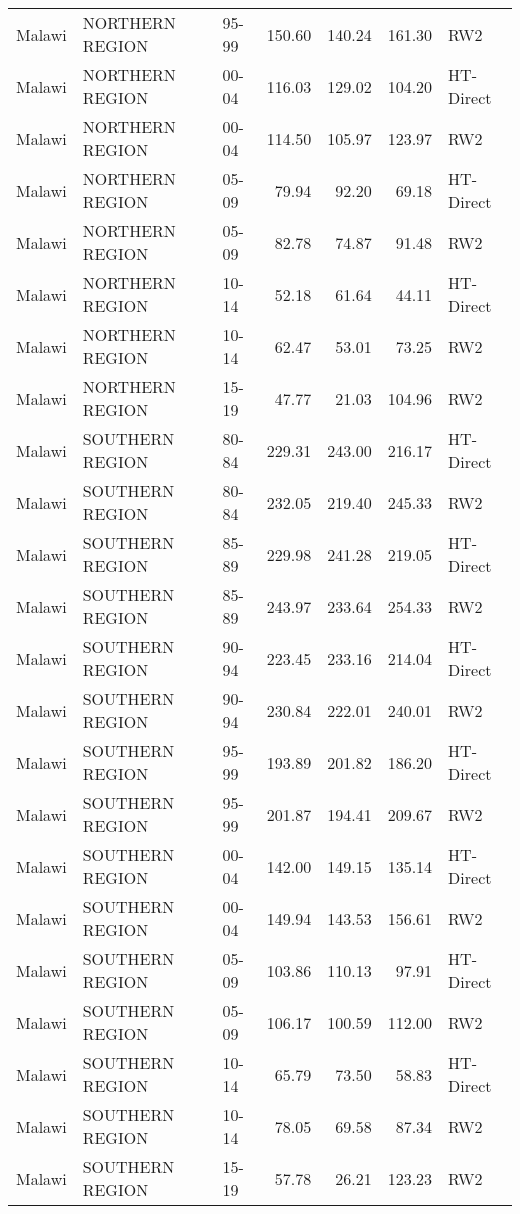 \begin{longtable}{lllrrrl}
  Malawi & NORTHERN REGION & 95-99 & 150.60 & 140.24 & 161.30 & RW2 \\ 
  Malawi & NORTHERN REGION & 00-04 & 116.03 & 129.02 & 104.20 & HT-Direct \\ 
  Malawi & NORTHERN REGION & 00-04 & 114.50 & 105.97 & 123.97 & RW2 \\ 
  Malawi & NORTHERN REGION & 05-09 & 79.94 & 92.20 & 69.18 & HT-Direct \\ 
  Malawi & NORTHERN REGION & 05-09 & 82.78 & 74.87 & 91.48 & RW2 \\ 
  Malawi & NORTHERN REGION & 10-14 & 52.18 & 61.64 & 44.11 & HT-Direct \\ 
  Malawi & NORTHERN REGION & 10-14 & 62.47 & 53.01 & 73.25 & RW2 \\ 
  Malawi & NORTHERN REGION & 15-19 & 47.77 & 21.03 & 104.96 & RW2 \\ 
  Malawi & SOUTHERN REGION & 80-84 & 229.31 & 243.00 & 216.17 & HT-Direct \\ 
  Malawi & SOUTHERN REGION & 80-84 & 232.05 & 219.40 & 245.33 & RW2 \\ 
  Malawi & SOUTHERN REGION & 85-89 & 229.98 & 241.28 & 219.05 & HT-Direct \\ 
  Malawi & SOUTHERN REGION & 85-89 & 243.97 & 233.64 & 254.33 & RW2 \\ 
  Malawi & SOUTHERN REGION & 90-94 & 223.45 & 233.16 & 214.04 & HT-Direct \\ 
  Malawi & SOUTHERN REGION & 90-94 & 230.84 & 222.01 & 240.01 & RW2 \\ 
  Malawi & SOUTHERN REGION & 95-99 & 193.89 & 201.82 & 186.20 & HT-Direct \\ 
  Malawi & SOUTHERN REGION & 95-99 & 201.87 & 194.41 & 209.67 & RW2 \\ 
  Malawi & SOUTHERN REGION & 00-04 & 142.00 & 149.15 & 135.14 & HT-Direct \\ 
  Malawi & SOUTHERN REGION & 00-04 & 149.94 & 143.53 & 156.61 & RW2 \\ 
  Malawi & SOUTHERN REGION & 05-09 & 103.86 & 110.13 & 97.91 & HT-Direct \\ 
  Malawi & SOUTHERN REGION & 05-09 & 106.17 & 100.59 & 112.00 & RW2 \\ 
  Malawi & SOUTHERN REGION & 10-14 & 65.79 & 73.50 & 58.83 & HT-Direct \\ 
  Malawi & SOUTHERN REGION & 10-14 & 78.05 & 69.58 & 87.34 & RW2 \\ 
  Malawi & SOUTHERN REGION & 15-19 & 57.78 & 26.21 & 123.23 & RW2 \\ 

\end{longtable}
